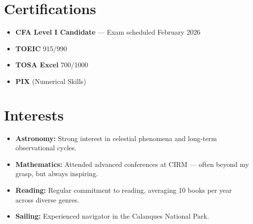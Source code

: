 \documentclass[a4paper,10pt]{article}
\begin{document}
\begin{minipage}[t]{0.5\textwidth}
\section*{Certifications}
\begin{itemize}[leftmargin=*]
    \item \textbf{CFA Level I Candidate} — Exam scheduled February 2026  
    \item \textbf{TOEIC} 915/990  
    \item \textbf{TOSA Excel} 700/1000  
    \item \textbf{PIX} (Numerical Skills)  
\end{itemize}
\vspace{0.4em}

\section*{Interests}
\begin{itemize}[leftmargin=*]
\item \textbf{Astronomy:} Strong interest in celestial phenomena and long-term observational cycles.  
\item \textbf{Mathematics:} Attended advanced conferences at CIRM — often beyond my grasp, but always inspiring.  
\item \textbf{Reading:} Regular commitment to reading, averaging 10 books per year across diverse genres.  
\item \textbf{Sailing:} Experienced navigator in the Calanques National Park.  

   \end{itemize}



\end{minipage}
\end{document}
